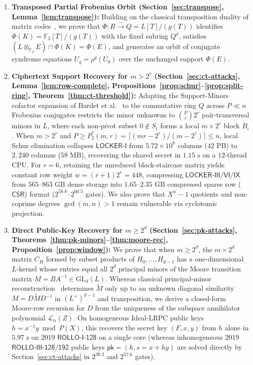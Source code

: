 \documentclass[11pt,a4paper]{article}
\theoremstyle{definition}
\theoremstyle{remark}
\newcommand{\Ftwo}{\mathbb{F}_2}
\newcommand{\GL}{\mathrm{GL}}
\begin{document}
\begin{enumerate}[leftmargin=1.8em,itemsep=2pt]
    \item \textbf{Transposed Partial Frobenius Orbit (Section~\ref{sec:transpose}, Lemma~\ref{lem:transpose}):} Building on the classical transposition duality of matrix codes~\cite{Delsarte78}, we prove that $\Phi: R \xrightarrow{\sim} Q = L[T]/(g(T))$ identifies $\Phi(K) = \Ftwo[T]/(g(T))$ with the fixed subring $Q^\rho$, satisfies $(L \otimes_{\Ftwo} E) \cap \Phi(K) = \Phi(E)$, and generates an orbit of conjugate syndrome equations $U_q = \rho^q(U_0)$ over the unchanged support $\Phi(E)$.
    \item \textbf{Ciphertext Support Recovery for $m > 2^r$ (Section~\ref{sec:ct-attacks}, Lemma~\ref{lem:row-complete}, Propositions~\ref{prop:schur}--\ref{prop:split-ring}, Theorem~\ref{thm:ct-threshold}):} Adapting the Support-Minors cofactor expansion of Bardet et al.~\cite{BBC+20,BBGT23} to the commutative ring $Q$ across $P \ll n$ Frobenius conjugates restricts the minor unknowns to $\binom{P}{r}2^r$ pair-transversal minors in $L$, where each non-pivot subset $0 \notin S_i$ forms a local $m \times 2^r$ block $B_i$. When $m > 2^r$ and $P \ge P_2^*(m, r) = \lceil(mr - 2^r)/(m - 2^r)\rceil \le n$, local Schur elimination collapses $\mathsf{LOCKER\text{-}I}$ from $5.72 \times 10^8$ columns ($42\text{ PB}$) to $2{,}240$ columns ($58\text{ MB}$), recovering the shared secret in $1.15\text{ s}$ on a $12$-thread CPU. For $r = 6$, retaining the unreduced block-staircase matrix yields constant row weight $w = (r+1)2^r = 448$, compressing $\mathsf{LOCKER\text{-}III/VI/IX}$ from $565\text{--}863\text{ GB}$ dense storage into $1.65\text{--}2.35\text{ GB}$ compressed sparse row ($\mathsf{CSR}$) format ($2^{58.8}\text{--}2^{60.5}$ gates). We also prove that $X^n - 1$ quotients and non-coprime degrees $\gcd(m, n) > 1$ remain vulnerable via cyclotomic projection.
    \item \textbf{Direct Public-Key Recovery for $m \ge 2^d$ (Section~\ref{sec:pk-attacks}, Theorems~\ref{thm:pk-minors}--\ref{thm:moore-rec}, Proposition~\ref{prop:window}):} We prove that when $m \ge 2^d$, the $m \times 2^d$ matrix $C_H$ formed by subset products of $H_0, \dots, H_{d-1}$ has a one-dimensional $L$-kernel whose entries equal all $2^d$ principal minors of the Moore transition matrix $M = B A^{-1} \in \GL_d(L)$. Whereas classical principal-minor reconstruction~\cite{Loewy86,GT06} determines $\tilde{M}$ only up to an unknown diagonal similarity $M = D \tilde{M} D^{-1}$ in $(L^\times)^{d-1}$ and transposition, we derive a closed-form Moore-row recursion for $D$ from the uniqueness of the subspace annihilator polynomial $\mathcal{L}_\alpha(Z)$. On homogeneous Ideal-LRPC public keys $h = x^{-1} y \bmod P(X)$, this recovers the secret key $(F, x, y)$ from $h$ alone in $5.97\text{ s}$ on $2019$ $\mathsf{ROLLO\text{-}I\text{-}128}$ on a single core (whereas inhomogeneous $2019$ $\mathsf{ROLLO\text{-}III\text{-}128/192}$ public keys $\mathsf{pk} = (h, s = x + h y)$ are solved directly by Section~\ref{sec:ct-attacks} in $2^{39.3}$ and $2^{57.6}$ gates).

\end{enumerate}
\end{document}

